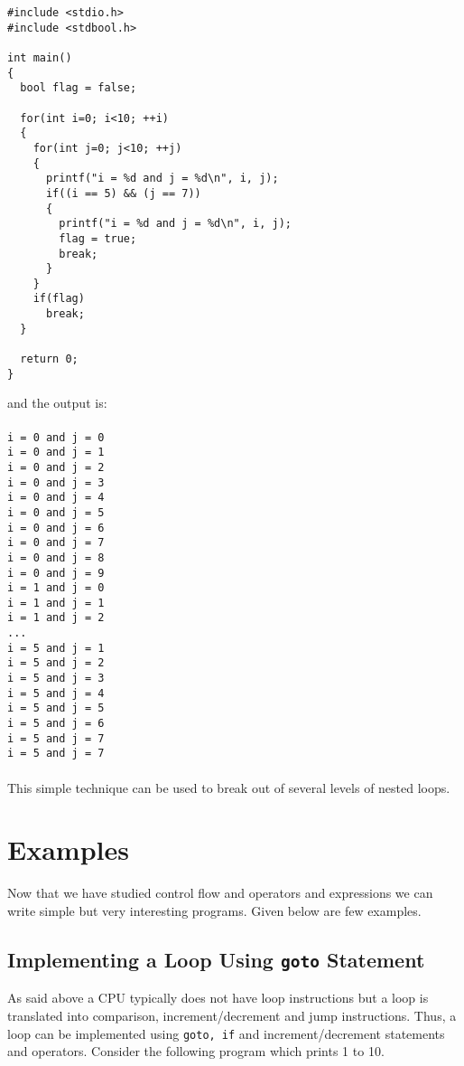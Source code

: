 \begin{verbatim}
#include <stdio.h>
#include <stdbool.h>

int main()
{
  bool flag = false;

  for(int i=0; i<10; ++i)
  {
    for(int j=0; j<10; ++j)
    {
      printf("i = %d and j = %d\n", i, j);
      if((i == 5) && (j == 7))
      {
        printf("i = %d and j = %d\n", i, j);
        flag = true;
        break;
      }
    }
    if(flag)
      break;
  }

  return 0;
}
\end{verbatim}
and the output is:
\\\\\texttt{i = 0 and j = 0\\
i = 0 and j = 1\\
i = 0 and j = 2\\
i = 0 and j = 3\\
i = 0 and j = 4\\
i = 0 and j = 5\\
i = 0 and j = 6\\
i = 0 and j = 7\\
i = 0 and j = 8\\
i = 0 and j = 9\\
i = 1 and j = 0\\
i = 1 and j = 1\\
i = 1 and j = 2\\
...\\
i = 5 and j = 1\\
i = 5 and j = 2\\
i = 5 and j = 3\\
i = 5 and j = 4\\
i = 5 and j = 5\\
i = 5 and j = 6\\
i = 5 and j = 7\\
i = 5 and j = 7\\\\}
This simple technique can be used to break out of several levels of nested
loops.

\section{Examples}
Now that we have studied control flow and operators and expressions we can
write simple but very interesting programs. Given below are few examples.

\subsection{Implementing a Loop Using \texttt{goto} Statement}
As said above a CPU typically does not have loop instructions but a loop is
translated into comparison, increment/decrement and jump instructions. Thus, a
loop can be implemented using \texttt{goto, if} and increment/decrement
statements and operators. Consider the following program which prints 1 to 10.

